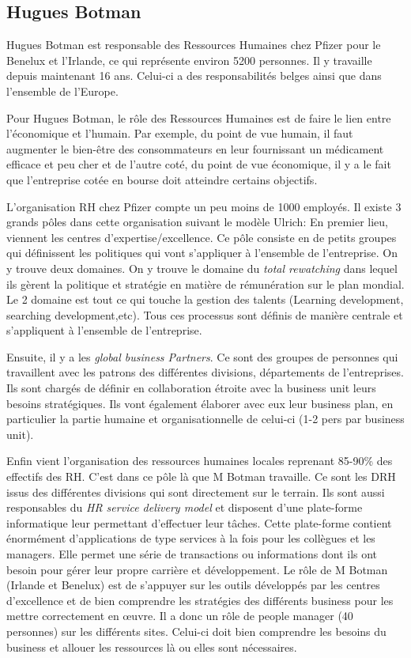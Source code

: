 \documentclass[a4paper, 12pt]{article}
\begin{document}
\subsection{Hugues Botman}

Hugues Botman est responsable des Ressources Humaines chez Pfizer pour le Benelux et l'Irlande, ce qui représente environ 5200 personnes. Il y travaille depuis maintenant 16 ans. Celui-ci a des responsabilités belges ainsi que dans l'ensemble de l'Europe. 

Pour Hugues Botman, le rôle des Ressources Humaines est de faire le lien entre l'économique et l'humain. Par exemple, du point de vue humain, il faut augmenter le bien-être des consommateurs en leur fournissant un médicament efficace et peu cher et de l'autre coté, du point de vue économique, il y a le fait que l'entreprise cotée en bourse doit atteindre certains objectifs.

L'organisation RH chez Pfizer compte un peu moins de 1000 employés. Il existe 3 grands pôles dans cette organisation suivant le modèle Ulrich:
En premier lieu, viennent les centres d'expertise/excellence. Ce pôle consiste en de petits groupes qui définissent les politiques qui vont s'appliquer à l'ensemble de l'entreprise. On y  trouve deux domaines. On y trouve  le domaine du \textit{total rewatching} dans lequel ils gèrent la politique et stratégie en matière de rémunération sur le plan mondial. Le 2 domaine est tout ce qui touche la gestion des talents (Learning development, searching development,etc). Tous ces processus sont définis de manière centrale et s'appliquent à l'ensemble de l'entreprise.

Ensuite, il y a les \textit{global business Partners}. Ce sont des groupes de personnes qui travaillent avec les patrons des différentes divisions, départements de l'entreprises. Ils sont chargés de définir en collaboration étroite avec la business unit leurs besoins stratégiques. Ils vont également élaborer avec eux leur business plan, en particulier la partie humaine et organisationnelle de celui-ci (1-2 pers par business unit).

Enfin vient l'organisation des ressources humaines locales reprenant 85-90\% des effectifs des RH. C'est dans ce pôle là que M Botman travaille. Ce sont les DRH issus des différentes divisions qui sont directement sur le terrain. Ils sont aussi responsables du \textit{HR service delivery model} et disposent d'une plate-forme informatique leur permettant d'effectuer leur tâches. Cette plate-forme contient énormément d'applications de type services à la fois pour les collègues et les managers. Elle permet une série de transactions ou informations dont ils ont besoin pour gérer leur propre carrière et développement.  Le rôle de M Botman (Irlande et Benelux) est de s'appuyer sur les outils développés par les centres d'excellence et de bien comprendre les stratégies des différents business pour les mettre correctement en œuvre. Il a donc un rôle de people manager (40 personnes) sur les différents sites. Celui-ci doit bien comprendre les besoins du business et allouer les ressources là ou elles sont nécessaires.
\end{document}
